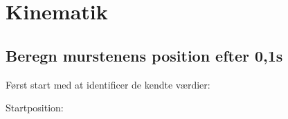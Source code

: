 \section{Kinematik}
\subsection{Beregn murstenens position efter 0,1s}
Først start med at identificer de kendte værdier:
\item Startposition: